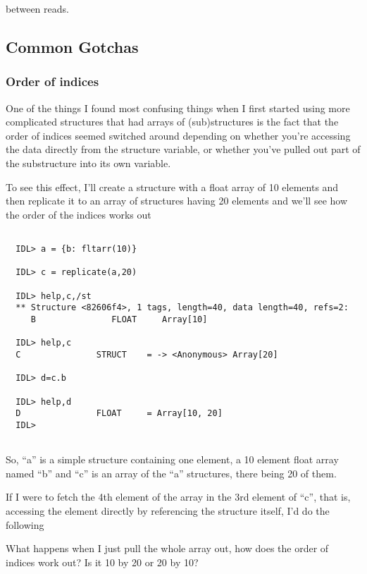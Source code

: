between reads.



\newpage
\subsection{Common Gotchas}

\subsubsection{Order of indices}

One of the things I found most confusing things when I first started
using more complicated structures that had arrays of (sub)structures
is the fact that the order of indices seemed switched around depending
on whether you're accessing the data directly from the structure
variable, or whether you've pulled out part of the substructure into
its own variable.

To see this effect, I'll create a structure with a float array of 10
elements and then replicate it to an array of structures having 20
elements and we'll see how the order of the indices works out

\begin{IDLExample}\begin{verbatim}

  IDL> a = {b: fltarr(10)}

  IDL> c = replicate(a,20)

  IDL> help,c,/st
  ** Structure <82606f4>, 1 tags, length=40, data length=40, refs=2:
     B               FLOAT     Array[10]

  IDL> help,c
  C               STRUCT    = -> <Anonymous> Array[20]

  IDL> d=c.b

  IDL> help,d
  D               FLOAT     = Array[10, 20]
  IDL> 


\end{verbatim}\end{IDLExample}


So, ``a'' is a simple structure containing one element, a 10 element
float array named ``b'' and ``c'' is an array of the ``a'' structures,
there being 20 of them. 

If I were to fetch the 4th element of the array in the 3rd element of
``c'', that is, accessing the element directly by referencing the
structure itself, I'd do the following


What happens when I just pull the whole array out, how does the order
of indices work out? Is it 10 by 20 or 20 by 10?


